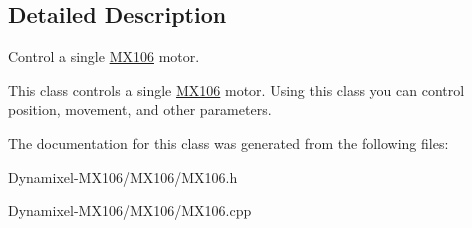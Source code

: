 \subsection{Detailed Description}
Control a single \hyperlink{class_m_x106}{M\+X106} motor. 

This class controls a single \hyperlink{class_m_x106}{M\+X106} motor. Using this class you can control position, movement, and other parameters. 

The documentation for this class was generated from the following files\+:\begin{DoxyCompactItemize}
\item 
Dynamixel-\/\+M\+X106/\+M\+X106/M\+X106.\+h\item 
Dynamixel-\/\+M\+X106/\+M\+X106/M\+X106.\+cpp\end{DoxyCompactItemize}
